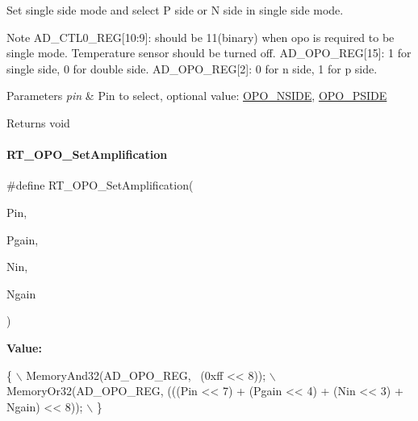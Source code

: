 Set single side mode and select P side or N side in single side mode. 

\begin{DoxyNote}{Note}
A\+D\+\_\+\+C\+T\+L0\+\_\+\+R\+EG\mbox{[}10\+:9\mbox{]}\+: should be 11(binary) when opo is required to be single mode. Temperature sensor should be turned off. A\+D\+\_\+\+O\+P\+O\+\_\+\+R\+EG\mbox{[}15\mbox{]}\+: 1 for single side, 0 for double side. A\+D\+\_\+\+O\+P\+O\+\_\+\+R\+EG\mbox{[}2\mbox{]}\+: 0 for n side, 1 for p side. 
\end{DoxyNote}

\begin{DoxyParams}{Parameters}
{\em pin} & Pin to select, optional value\+: \mbox{\hyperlink{a00002_afb2207320139ac264d5cc1600d3cae9eafd1c5b2cbd5e5a8866364e6af2dbd4c0}{O\+P\+O\+\_\+\+N\+S\+I\+DE}}, \mbox{\hyperlink{a00002_afb2207320139ac264d5cc1600d3cae9ea740f1053bc0489a53c4cfe9bfc3de403}{O\+P\+O\+\_\+\+P\+S\+I\+DE}} \\
\hline
\end{DoxyParams}
\begin{DoxyReturn}{Returns}
void 
\end{DoxyReturn}
\mbox{\label{a00002_ab2a6c21c91c7f05f3de9fefbd30ff95b}} 
\paragraph{\texorpdfstring{R\+T\+\_\+\+O\+P\+O\+\_\+\+Set\+Amplification}{RT\_OPO\_SetAmplification}}
{\footnotesize\ttfamily \#define R\+T\+\_\+\+O\+P\+O\+\_\+\+Set\+Amplification(\begin{DoxyParamCaption}\item[{}]{Pin,  }\item[{}]{Pgain,  }\item[{}]{Nin,  }\item[{}]{Ngain }\end{DoxyParamCaption})}

{\bfseries Value\+:}
\begin{DoxyCode}
\{                                                                                    \(\backslash\)
        MemoryAnd32(AD\_OPO\_REG, ~(0xff << 8));                                           \(\backslash\)
        MemoryOr32(AD\_OPO\_REG, (((Pin << 7) + (Pgain << 4) + (Nin << 3) + Ngain) << 8)); \(\backslash\)
    \}
\end{DoxyCode}


